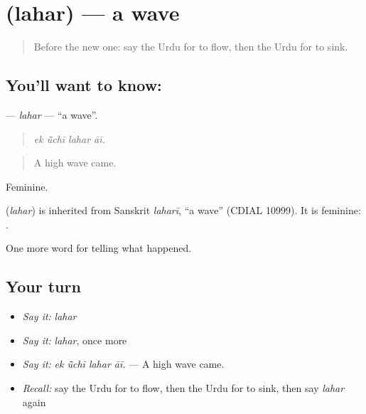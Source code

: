 \section[\texorpdfstring{\ur{لہر} (lahar)}{لہر (lahar)}]{ (lahar) — a wave}

\label{lesson:UR-C293-lahar}



\begin{quote}
Before the new one: say the Urdu for to flow, then the Urdu for to sink.
\end{quote}

\subsection*{You'll want to know: }
\textbf{} — \emph{lahar} — \textquotedblleft{}a wave\textquotedblright{}.

\begin{quote}
   
\end{quote}

\begin{quote}
\emph{ek ū̃chī lahar āī.}
\end{quote}

\begin{quote}
A high wave came.
\end{quote}

Feminine.

\begin{cousinweb}
\textbf{} (\emph{lahar}) is inherited from Sanskrit \emph{laharī}, \textquotedblleft{}a wave\textquotedblright{} (CDIAL 10999). It is feminine: \textbf{ }.
\end{cousinweb}

\begin{grammarlens}[title={What you've built}]
One more word for telling what happened.
\end{grammarlens}

\subsection*{Your turn}
\begin{itemize}
\raggedright
  \item \emph{Say it:} \emph{lahar}
  \item \emph{Say it:} \emph{lahar}, once more
  \item \emph{Say it:} \emph{ek ū̃chī lahar āī.} — A high wave came.
  \item \emph{Recall:} say the Urdu for to flow, then the Urdu for to sink, then say \emph{lahar} again
\end{itemize}

